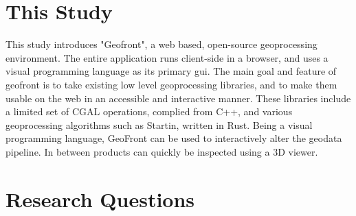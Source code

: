 \section{This Study}

This study introduces "Geofront", a web based, open-source geoprocessing environment. 
The entire application runs client-side in a browser, and uses a visual programming language as its primary \ac{gui}.
The main goal and feature of geofront is to take existing low level geoprocessing libraries, and to make them usable on the web in an accessible and interactive manner. 
These libraries include a limited set of CGAL operations, complied from C++, and various geoprocessing algorithms such as Startin, written in Rust. 
Being a visual programming language, GeoFront can be used to interactively alter the geodata pipeline. 
In between products can quickly be inspected using a 3D viewer.














\newpage
\section{Research Questions}

